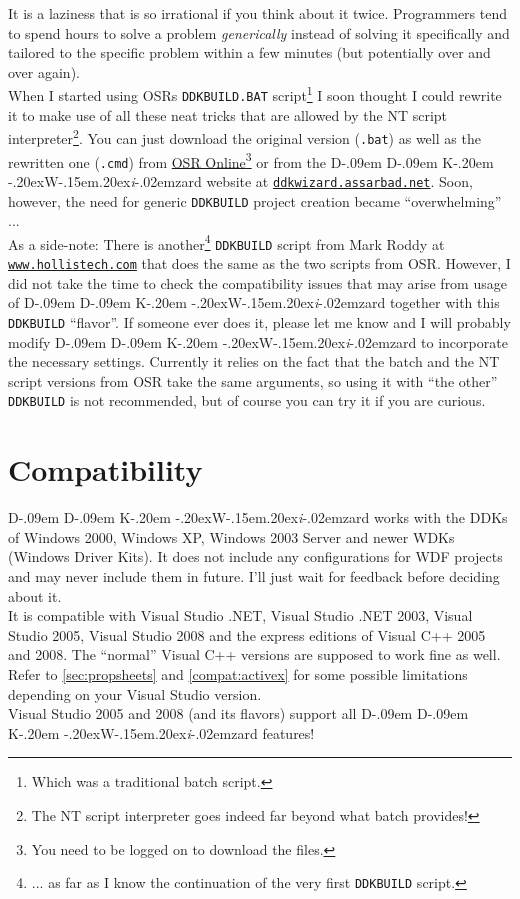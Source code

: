 \documentclass[a4paper,titlepage]{report}
\newcommand{\linkclr}[1]{\textcolor[rgb]{0.00,0.00,0.60}{#1}}
\newcommand{\extlink}[2]{\href{#1}{\linkclr{#2}}}
\newcommand{\extlinktt}[2]{\href{#1}{\texttt{\linkclr{#2}}}}
\def\ddkwiz{D\kern-.09em D\kern-.09em K\kern-.20em \raise-.20ex\hbox{W}\kern-.15em\raise.20ex\hbox{\it{i}}\kern-.02em{zard}}
\begin{document}
It is a laziness that is so irrational if you think about it twice.
Programmers tend to spend hours to solve a problem \emph{generically}\texttrademark{}
instead of solving it specifically and tailored to the specific problem within a few
minutes (but potentially over and over again).\\

When I started using OSRs \texttt{DDKBUILD.BAT} script\footnote{Which was a traditional batch script.}
I soon thought I could rewrite it to make use of all these neat tricks
that are allowed by the NT script interpreter\footnote{The NT script interpreter
goes indeed far beyond what batch provides!}. You can just download the original
version (\texttt{.bat}) as well as the rewritten one (\texttt{.cmd}) from
\extlink{http://www.osronline.com/article.cfm?article=43}{OSR Online}\footnote{You need to be logged on to download the files.}
or from the \ddkwiz{} website at \extlinktt{http://ddkwizard.assarbad.net}{ddkwizard.assarbad.net}.
Soon, however, the need for generic \texttt{DDKBUILD} project creation became ``overwhelming'' ...\\

As a side-note: There is another\footnote{... as far as I know the continuation of
the very first \texttt{DDKBUILD} script.} \texttt{DDKBUILD} script from Mark Roddy at
\extlinktt{http://www.hollistech.com}{www.hollistech.com}
that does the same as the two scripts from OSR. However, I did not take the time
to check the compatibility issues that may arise from usage of \ddkwiz{} together
with this \texttt{DDKBUILD} ``flavor''. If someone ever does it, please let me know
and I will probably modify \ddkwiz{} to incorporate the necessary
settings. Currently it relies on the fact that the batch and the NT script
versions from OSR take the same arguments, so using it with ``the other''
\texttt{DDKBUILD} is not recommended, but of course you can try it if you are curious.

\section*{Compatibility} \ddkwiz{} works with the DDKs of
Windows 2000, Windows XP, Windows 2003 Server and newer WDKs (Windows Driver Kits).
It does not include any configurations for WDF projects and may never include
them in future. I'll just wait for feedback before deciding about it.\\
It is compatible with Visual Studio .NET, Visual Studio .NET 2003, Visual Studio 2005,
Visual Studio 2008 and the express editions of Visual C++ 2005 and 2008. The ``normal''
Visual C++ versions are supposed to work fine as well. Refer to \autoref{sec:propsheets}
and \autoref{compat:activex} for some possible limitations depending
on your Visual Studio version.\\
Visual Studio 2005 and 2008 (and its flavors) support all \ddkwiz{} features!
\end{document}
